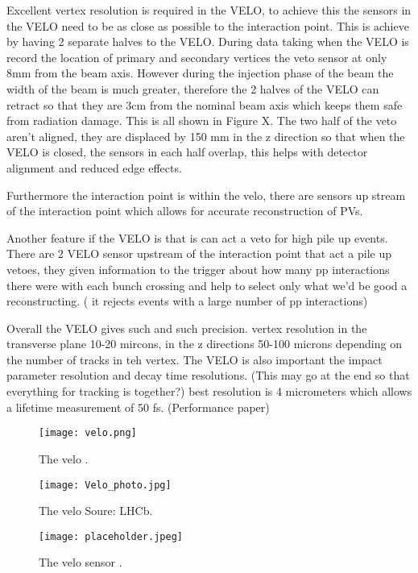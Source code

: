 Excellent vertex resolution is required in the VELO, to achieve this the sensors in the VELO need to be as close as possible to the interaction point. This is achieve by having 2 separate halves to the VELO. During data taking when the VELO is record the location of primary and secondary vertices the veto sensor at only 8mm from the beam axis. However during the injection phase of the beam the width of the beam is much greater, therefore the 2 halves of the VELO can retract so that they are 3cm from the nominal beam axis which keeps them safe from radiation damage. This is all shown in Figure X. The two half of the veto aren’t aligned, they are displaced by 150 mm in the z direction so that when the VELO is closed, the sensors in each half overlap, this helps with detector alignment and reduced edge effects.


Furthermore the interaction point is within the velo, there are sensors up stream of the interaction point which allows for accurate reconstruction of PVs.


Another feature if the VELO is that is can act a veto for high pile up events. There are 2 VELO sensor upstream of the interaction point that act a pile up vetoes, they given information to the trigger about how many pp interactions there were with each bunch crossing and help to select only what we’d be good a reconstructing. ( it rejects events with a large number of pp interactions)

Overall the VELO gives such and such precision.  vertex resolution in the transverse plane 10-20 mircons, in the z directions 50-100 microns depending on the number of tracks in teh vertex. The VELO is also important the impact parameter resolution and decay time resolutions.  (This may go at the end so that everything for tracking is together?) best resolution is 4 micrometers which allows a lifetime measurement of 50 fs. (Performance paper)


\begin{figure}[tb] 
  \centering    
  \texttt{[image: velo.png]}
  \caption{The velo \cite{Alves:2008zz}.}
  \label{fig:velo}
\end{figure}

\begin{figure}[tb] 
  \centering    
  \texttt{[image: Velo\_photo.jpg]}
  \caption{The velo Soure: LHCb.}
  \label{fig:velo_photo}
\end{figure}

\begin{figure}[tb] 
  \centering    
  \texttt{[image: placeholder.jpeg]}
  \caption{The velo sensor \cite{Alves:2008zz}.}
  \label{fig:velo_sensor}
\end{figure}

